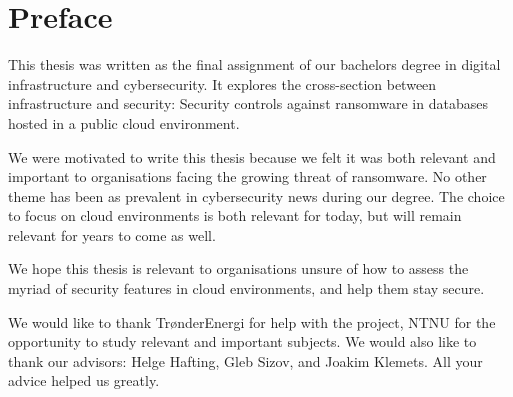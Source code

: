 \chapter*{Preface}
This thesis was written as the final assignment of our bachelors degree in digital infrastructure and cybersecurity. It explores the cross-section between infrastructure and security: Security controls against ransomware in databases hosted in a public cloud environment.

We were motivated to write this thesis because we felt it was both relevant and important to organisations facing the growing threat of ransomware. No other theme has been as prevalent in cybersecurity news during our degree. The choice to focus on cloud environments is both relevant for today, but will remain relevant for years to come as well.

We hope this thesis is relevant to organisations unsure of how to assess the myriad of security features in cloud environments, and help them stay secure. 

We would like to thank TrønderEnergi for help with the project, NTNU for the opportunity to study relevant and important subjects. We would also like to thank our advisors: Helge Hafting, Gleb Sizov, and Joakim Klemets. All your advice helped us greatly. 